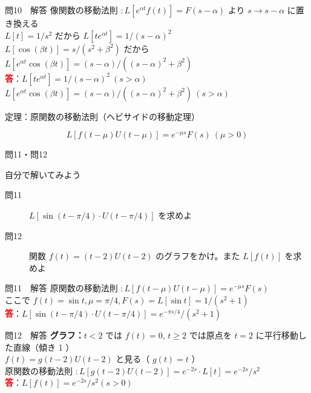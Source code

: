 \documentclass[professionalfonts]{beamer}
\begin{document}
\begin{frame}{問10　解答}
  像関数の移動法則 $: L[e^{\alpha t}f(t)] = F(s-\alpha)$ より $s \to s-\alpha$ に置き換える\\[4pt]
  $L[t] = 1/s^{2}$ だから $L[te^{\alpha t}] = 1/(s-\alpha)^{2}$\\[4pt]
  $L[\cos(\beta t)] = s/(s^{2}+\beta^{2})$ だから $L[e^{\alpha t}\cos(\beta t)] = (s-\alpha)/((s-\alpha)^{2}+\beta^{2})$
  \\[8pt]\textcolor{red}{\textbf{答}}：$L[te^{\alpha t}] = 1/(s-\alpha)^{2} \ (s > \alpha)$\\
  $L[e^{\alpha t}\cos(\beta t)] = (s-\alpha)/((s-\alpha)^{2}+\beta^{2}) \ (s > \alpha)$
\end{frame}

\begin{frame}{定理：原関数の移動法則（ヘビサイドの移動定理）}
  \begin{block}{}
  \[
    L[f(t-\mu)U(t-\mu)] = e^{-\mu s}F(s) \ (\mu > 0)
  \]
  \end{block}
\end{frame}

\begin{frame}{問11・問12}
  \begin{exampleblock}{自分で解いてみよう}
  \begin{description}
    \item[問11] $L[\sin(t - \pi/4)\cdot U(t - \pi/4)]$ を求めよ
    \item[問12] 関数 $f(t) = (t-2)U(t-2)$ のグラフをかけ。また $L[f(t)]$ を求めよ
  \end{description}
  \end{exampleblock}
\end{frame}

\begin{frame}{問11　解答}
  原関数の移動法則 $: L[f(t-\mu)U(t-\mu)] = e^{-\mu s}F(s)$\\[4pt]
  ここで $f(t) = \sin t, \mu = \pi/4, F(s) = L[\sin t] = 1/(s^{2}+1)$
  \\[8pt]\textcolor{red}{\textbf{答}}：$L[\sin(t-\pi/4)\cdot U(t-\pi/4)] = e^{-\pi s/4}/(s^{2}+1)$
\end{frame}

\begin{frame}{問12　解答}
  \textbf{グラフ：}$t < 2$ では $f(t)=0$, $t \geq 2$ では原点を $t=2$ に平行移動した直線（傾き 1 ）\\[0.3em]
  $f(t) = g(t-2)U(t-2)$ と見る（ $g(t) = t$ ）\\[4pt]
  原関数の移動法則 $: L[g(t-2)U(t-2)] = e^{-2s}\cdot L[t] = e^{-2s}/s^{2}$
  \\[8pt]\textcolor{red}{\textbf{答}}：$L[f(t)] = e^{-2s}/s^{2}  (s > 0)$
\end{frame}
\end{document}
